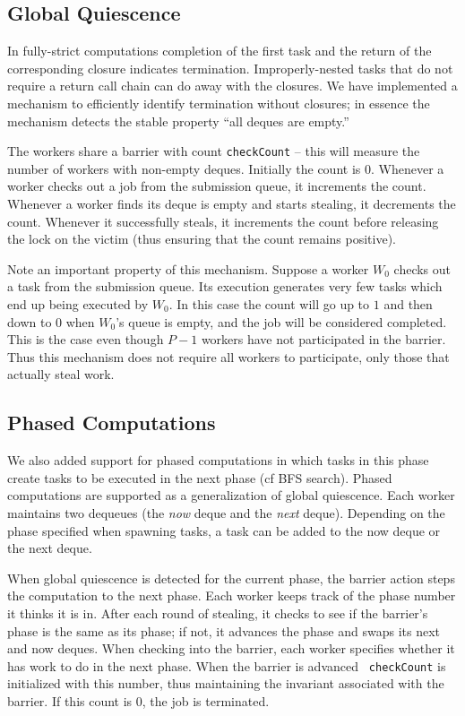 \subsection{Global Quiescence}

In fully-strict computations completion of the first task and the
return of the corresponding closure indicates termination.
Improperly-nested tasks that do not require a return call chain can do
away with the closures. We have implemented a mechanism to efficiently
identify termination without closures; in essence the mechanism detects
the stable property ``all deques are empty.'' 

The workers share a barrier with count {\tt checkCount} -- this will
measure the number of workers with non-empty deques.  Initially the
count is $0$. Whenever a worker checks out a job from the submission
queue, it increments the count. Whenever a worker finds its deque is
empty and starts stealing, it decrements the count. Whenever it
successfully steals, it increments the count before releasing the lock
on the victim (thus ensuring that the count remains positive).

Note an important property of this mechanism. Suppose a worker $W_0$
checks out a task from the submission queue. Its execution generates
very few tasks which end up being executed by $W_0$. In this case the
count will go up to $1$ and then down to $0$ when $W_0$'s queue is
empty, and the job will be considered completed. This is the case even
though $P-1$ workers have not participated in the barrier. Thus this
mechanism does not require all workers to participate, only those that
actually steal work.

\subsection{Phased Computations}
We also added support for phased computations in which tasks in this
phase create tasks to be executed in the next phase (cf BFS search).
Phased computations are supported as a generalization of global
quiescence. Each worker maintains two dequeues (the {\em now} deque and the
{\em next} deque).  Depending on the phase specified when spawning
tasks, a task can be added to the now deque or the next deque.

When global quiescence is detected for the current phase, the barrier
action steps the computation to the next phase. Each worker keeps
track of the phase number it thinks it is in. After each round of
stealing, it checks to see if the barrier's phase is the same as its
phase; if not, it advances the phase and swaps its next and now
deques. When checking into the barrier, each worker specifies whether
it has work to do in the next phase. When the barrier is advanced {\tt
checkCount} is initialized with this number, thus maintaining the
invariant associated with the barrier.  If this count is $0$, the job
is terminated.

